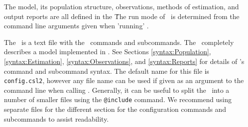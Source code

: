 The model, its population structure, observations, methods of estimation, and output reports are all defined in the \config\. The run mode of \CNAME\ is determined from the command line arguments given when 'running' \CNAME.

The \config\ is a text file with the \CNAME\ commands and subcommands. The \config\ completely describes a model implemented in \CNAME. See Sections \ref{syntax:Population}, \ref{syntax:Estimation}, \ref{syntax:Observations}, and \ref{syntax:Reports} for details of \CNAME's command and subcommand syntax.  The default name for this file is \texttt{config.csl2}, however any file name can be used if given as an argument to the command line when calling \CNAME. Generally, it can be useful to split the \config\ into a number of smaller files using the \texttt{@include} command. We recommend using separate files for the different section for the configuration commands and subcommands to assist readability.
